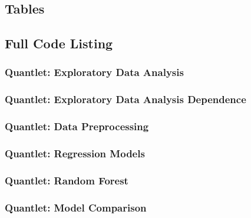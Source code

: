 \subsection{Tables}





\label{table:regs}





\FloatBarrier

\subsection{Full Code Listing}
\subsubsection{Quantlet: Exploratory Data Analysis}

\subsubsection{Quantlet: Exploratory Data Analysis Dependence}

\subsubsection{Quantlet: Data Preprocessing}

\subsubsection{Quantlet: Regression Models}

\subsubsection{Quantlet: Random Forest}

\subsubsection{Quantlet: Model Comparison}

